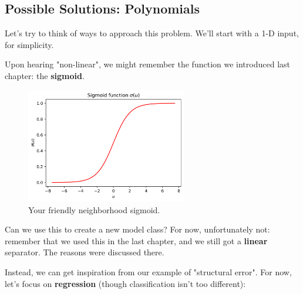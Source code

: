     \subsecdiv

    \subsection*{Possible Solutions: Polynomials}

        Let's try to think of ways to approach this problem. We'll start with a 1-D input, for simplicity.

        Upon hearing "non-linear", we might remember the function we introduced last chapter: the \textbf{sigmoid}.
    
        \begin{figure}[H]
            \centering
            
            \includegraphics[width=70mm,scale=0.5]{images/feature_images/sigmoid_u.png}
            \caption*{Your friendly neighborhood sigmoid.}
        \end{figure}
    
        Can we use this to create a new model class? For now, unfortunately not: remember that we used this in the last chapter, and we still got a \textbf{linear} separator. The reasons were discussed there.
    
        Instead, we can get inspiration from our example of "structural error". For now, let's focus on \textbf{regression} (though classification isn't too different):
    
